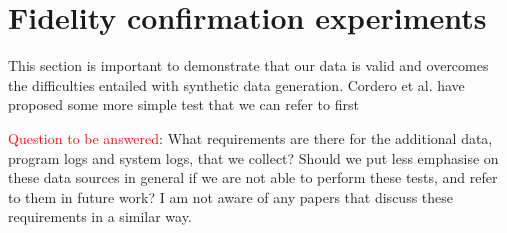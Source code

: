 \documentclass{article}
\begin{document}
%
%
%
%
%
%
%
%
%
%
%
%
%


\section{Fidelity confirmation experiments}\label{Sec:Experiments}

This section is important to demonstrate that our data is valid and overcomes the difficulties entailed with synthetic data generation. Cordero et al. have proposed some more simple test that we can refer to first

\textcolor{red}{Question to be answered}: What requirements are there for the additional data, program logs and system logs, that we collect? Should we put less emphasise on these data sources in general if we are not able to perform these tests, and refer to them in future work? I am not aware of any papers that discuss these requirements in a similar way. 
\end{document}
